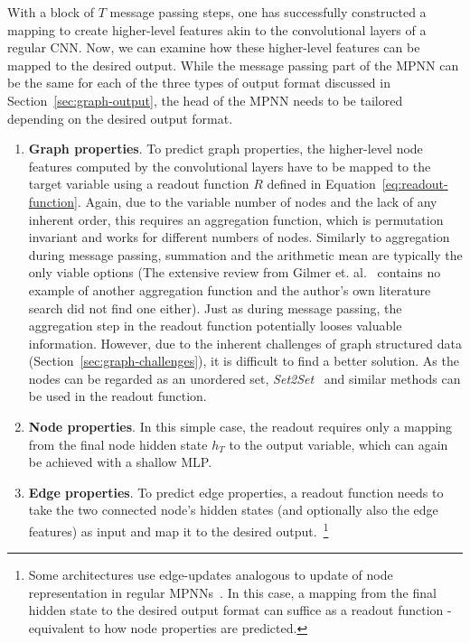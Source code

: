 With a block of $T$ message passing steps, one has successfully constructed a mapping to create higher-level features akin to the convolutional layers of a regular CNN. Now, we can examine how these higher-level features can be mapped to the desired output. While the message passing part of the MPNN can be the same for each of the three types of output format discussed in Section~\ref{sec:graph-output}, the head of the MPNN needs to be tailored depending on the desired output format.

\begin{enumerate}
	\item \textbf{Graph properties}. To predict graph properties, the higher-level node features computed by the convolutional layers have to be mapped to the target variable using a readout function $R$ defined in Equation~\ref{eq:readout-function}. Again, due to the variable number of nodes and the lack of any inherent order, this requires an aggregation function, which is permutation invariant and works for different numbers of nodes. Similarly to aggregation during message passing, summation and the arithmetic mean are typically the only viable options (The extensive review from Gilmer et. al.~\cite{Gilmer2017} contains no example of another aggregation function and the author's own literature search did not find one either).
	Just as during message passing, the aggregation step in the readout function potentially looses valuable information. However, due to the inherent challenges of graph structured data (Section~\ref{sec:graph-challenges}), it is difficult to find a better solution. As the nodes can be regarded as an unordered set, \textit{Set2Set}~\cite{Vinyals2015} and similar methods can be used in the readout function.
	\item \textbf{Node properties}. In this simple case, the readout requires only a mapping from the final node hidden state $h_T$ to the output variable, which can again be achieved with a shallow MLP.
	\item \textbf{Edge properties}. To predict edge properties, a readout function needs to take the two connected node's hidden states (and optionally also the edge features) as input and map it to the desired output.~\footnote{Some architectures use edge-updates analogous to update of node representation in regular MPNNs~\cite{Jørgensen2018}. In this case, a mapping from the final hidden state to the desired output format can suffice as a readout function - equivalent to how node properties are predicted.}
\end{enumerate}


